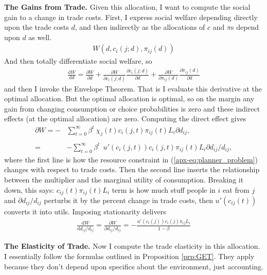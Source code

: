 \documentclass[12pt,pdftex]{article}
\begin{document}
\begin{onehalfspacing}
\textbf{The Gains from Trade.} Given this allocation, I want to compute the social gain to a change in trade costs. First, I express social welfare depending directly upon the trade costs $d$, and then indirectly as the allocations of $c$ and $\pi$s depend upon $d$ as well.
\begin{align}
W(d, c_{i}(j; d), \pi_{ij}(d))
\end{align}
And then totally differentiate social welfare, so
\begin{align}
\frac{\mathrm{d} W}{\mathrm{d}d} = \frac{\partial W}{\partial d} + \frac{\partial W}{\partial c_{i}(j;d)}\frac{\partial c_{i}(j;d)}{\partial d} + \frac{\partial W}{\partial \pi_{ij}(d)}\frac{\partial \pi_{ij}(d)}{\partial d}
\end{align}
and then I invoke the Envelope Theorem. That is I evaluate this derivative at the optimal allocation. But the optimal allocation is optimal, so on the margin any gain from changing consumption or choice probabilities is zero and these indirect effects (at the optimal allocation) are zero. Computing the direct effect gives
\begin{align}
\partial W = - & \sum_{t=0}^{\infty} \beta^{t} \ \chi_{j}(t) c_{i}(j,t) \pi_{ij}(t) L_{i} \partial d_{ij}, \\
\nonumber \\
=& - \sum_{t=0}^{\infty} \beta^{t} \  \ u'(c_{i}(j,t)) c_{i}(j,t) \pi_{ij}(t) L_{i} \partial d_{ij} / d_{ij},
\end{align}
where the first line is how the resource constraint in (\ref{apx-eq:planner_problem}) changes with respect to trade costs. Then the second line inserts the relationship between the multiplier and the marginal utility of consumption.  Breaking it down, this says: $c_{ij}(t) \pi_{ij}(t) L_{i}$ term is how much stuff people in $i$ eat from $j$ and $\partial d_{ij} / d_{ij}$ perturbs it by the percent change in trade costs, then $u'(c_{ij}(t))$ converts it into utils. Imposing stationarity delivers
\begin{align}
\frac{\mathrm{d} W}{\mathrm{d}d_{ij} / d_{ij}} = \frac{\partial W}{\partial d_{ij} / d_{ij}} = -\frac{ u'(c_{i}(j)) c_{i}(j) \pi_{ij} L_{i}}{1- \beta} \label{apx-eq:gains1}
\end{align}

\textbf{The Elasticity of Trade.} Now I compute the trade elasticity in this allocation. I essentially follow the formulas outlined in Proposition \ref{prp:GET}. They apply because they don't depend upon specifics about the environment, just accounting.


\end{onehalfspacing}
\end{document}
